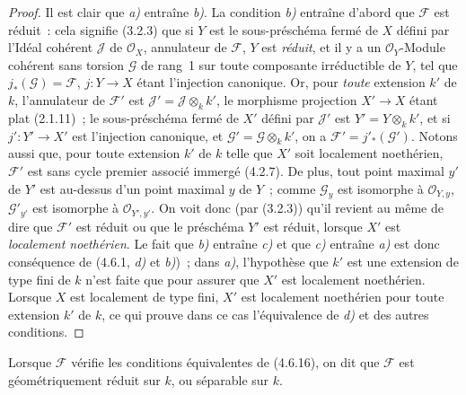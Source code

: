 \begin{proof}
Il est clair que \emph{a)} entraîne \emph{b)}. La condition \emph{b)} entraîne d'abord que
$\mathscr F$ est réduit~: cela signifie (3.2.3) que si $Y$ est le
sous-préschéma fermé de $X$ défini par l'Idéal cohérent $\mathscr J$ de
$\mathcal O_X$, annulateur de $\mathscr F$, $Y$ est \emph{réduit}, et il y a un
$\mathcal O_Y$-Module cohérent sans torsion $\mathscr G$ de rang~1 sur toute
composante irréductible de $Y$, tel que $j_*(\mathscr G)=\mathscr F$,
$j:Y\to X$ étant l'injection canonique. Or, pour \emph{toute} extension $k'$ de $k$,
l'annulateur de $\mathscr F'$ est $\mathscr J'=\mathscr J\otimes_k k'$, le
morphisme projection $X'\to X$ étant plat (2.1.11)~; le sous-préschéma fermé de
$X'$ défini par $\mathscr J'$ est $Y'=Y\otimes_k k'$, et si
$j':Y'\to X'$ est l'injection canonique, et
$\mathscr G'=\mathscr G\otimes_k k'$, on a $\mathscr F'=j'_*(\mathscr G')$.
Notons aussi que, pour toute extension $k'$ de $k$ telle que $X'$ soit
localement noethérien, $\mathscr F'$ est sans cycle premier associé immergé
(4.2.7). De plus, tout point maximal $y'$ de $Y'$ est au-dessus d'un point
maximal $y$ de $Y$~; comme $\mathscr G_y$ est isomorphe à
$\mathcal O_{Y,y}$, $\mathscr G'_{y'}$ est isomorphe à
$\mathcal O_{Y',y'}$. On voit donc (par (3.2.3)) qu'il revient au même de dire
que $\mathscr F'$ est réduit ou que le préschéma $Y'$ est réduit, lorsque $X'$
est \emph{localement noethérien}. Le fait que \emph{b)} entraîne \emph{c)} et que \emph{c)} entraîne
\emph{a)} est donc conséquence de (4.6.1, \emph{d)} et \emph{b)})~; dans \emph{a)}, l'hypothèse que
$k'$ est une extension de type fini de $k$ n'est faite que pour assurer que
$X'$ est localement noethérien. Lorsque $X$ est localement de type fini, $X'$
est localement noethérien pour toute extension $k'$ de $k$, ce qui prouve dans
ce cas l'équivalence de \emph{d)} et des autres conditions.
\end{proof}

\begin{definition}[4.6.17]
\label{IV.2.4.6.17-fr}
Lorsque $\mathscr F$ vérifie les conditions équivalentes de \textup{(4.6.16)}, on dit
que $\mathscr F$ est géométriquement réduit sur $k$, ou séparable
sur $k$.
\end{definition}

